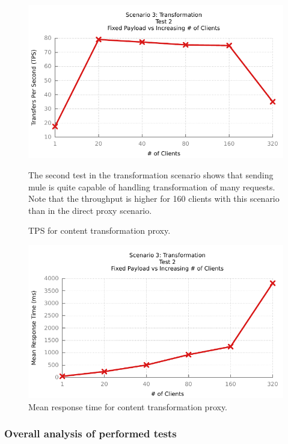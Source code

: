 \begin{figure}[H]
	\caption{TPS for content transformation proxy.}
	\centerline{\includegraphics{img/transform_fp_iu_tps}}
	\label{fig:transform-2-1}
	The second test in the transformation scenario shows that sending mule is quite capable of handling transformation of many requests. Note that the throughput is higher for 160 clients with this scenario than in the direct proxy scenario.

\end{figure}

\begin{figure}[H]
	\caption{Mean response time for content transformation proxy.}
	\centerline{\includegraphics{img/transform_fp_iu_resp}}
	\label{fig:transform-2-2}
\end{figure}


\subsubsection{Overall analysis of performed tests}
\label{sec:test-final-analysis}


